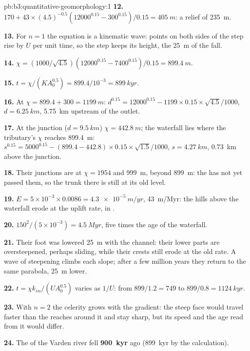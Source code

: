 \begin{solution}{pb:b3:quantitative-geomorphology:1}
\textbf{12.} $170 + 43\times(4.5)^{-0.5}(12000^{0.15} - 300^{0.15})/0.15 =
\qty{405}{m}$: a relief of \qty{235}{m}.

\textbf{13.} For $n = 1$ the equation is a kinematic wave: points on both
sides of the step rise by $U$ per unit time, so the step keeps its height,
the \qty{25}{m} of the fall.

\textbf{14.} $\chi = (1000/\sqrt{4.5})(12000^{0.15} - 7400^{0.15})/0.15 =
\qty{899.4}{m}$.

\textbf{15.} $t = \chi/(KA_0^{0.5}) = 899.4/10^{-3} = \qty{899}{kyr}$.

\textbf{16.} At $\chi = 899.4 + 300 = \qty{1199}{m}$:
$d^{0.15} = 12000^{0.15} - 1199\times0.15\times\sqrt{4.5}/1000$, $d =
\qty{6.25}{km}$, \qty{5.75}{km} upstream of the outlet.

\textbf{17.} At the junction ($d = \qty{9.5}{km}$) $\chi = \qty{442.8}{m}$;
the waterfall lies where the tributary's $\chi$ reaches \qty{899.4}{m}:
$s^{0.15} = 5000^{0.15} - (899.4 - 442.8)\times0.15\times\sqrt{1.5}/1000$,
$s = \qty{4.27}{km}$, \qty{0.73}{km} above the junction.

\textbf{18.} Their junctions are at $\chi = 1954$ and \qty{999}{m}, beyond
\qty{899}{m}: the  has not yet passed them, so the trunk there is
still at its old level.

\textbf{19.} $E = 5\times10^{-3}\times0.0086 = \qty{4.3e-5}{m/yr}$,
\qty{43}{m/Myr}: the hills above the waterfall erode at the uplift rate, in
.

\textbf{20.} $150^2/(5\times10^{-3}) = \qty{4.5}{Myr}$, five times the age of
the waterfall.

\textbf{21.} Their foot was lowered \qty{25}{m} with the channel: their
lower parts are oversteepened, perhaps sliding, while their crests still
erode at the old rate. A wave of steepening climbs each slope; after a few
million years they return to the same parabola, \qty{25}{m} lower.

\textbf{22.} $t = \chi k_{sn}/(U A_0^{0.5})$ varies as $1/U$: from
$899/1.2 = 749$ to $899/0.8 = \qty{1124}{kyr}$.

\textbf{23.} With $n = 2$ the celerity grows with the gradient: the steep
face would travel faster than the reaches around it and stay sharp, but
its speed and the age read from it would differ.

\textbf{24.} The  of the Varden river fell
\textbf{\qty[text-series-to-math=true]{900}{kyr}} ago (\qty{899}{kyr} by the
calculation).
\end{solution}
